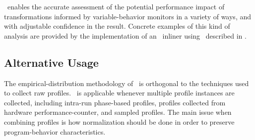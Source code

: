 \CP\ enables the accurate assessment of the
potential performance impact of transformations informed by
variable-behavior monitors in a variety of ways, and with adjustable
confidence in the result. Concrete examples of this kind of analysis
are provided by the implementation of an \FDO\ inliner using
\CP\ described in \cite{BerubePhD}.


\subsection{Alternative Usage}
\label{cp:extend}

The empirical-distribution methodology of \CP\ is orthogonal to the
techniques used to collect raw profiles.  \CP\ is applicable whenever
multiple profile instances are collected, including intra-run
phase-based profiles, profiles collected from hardware
performance-counter, and sampled profiles.  The main issue when
combining profiles is how normalization should be done in order to
preserve program-behavior characteristics.
